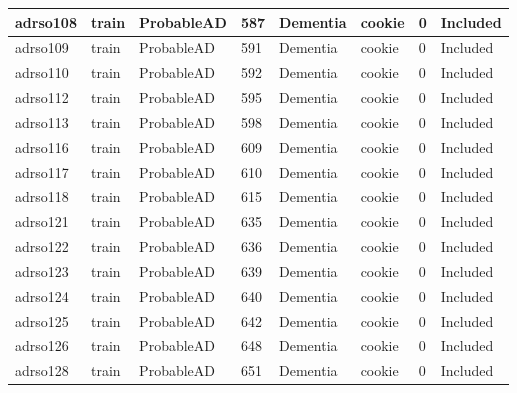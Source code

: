 \begin{center}
\begin{longtable}{|l|l|l|l|l|l|l|l|}
adrso108  & train            & ProbableAD   & 587         & Dementia             & cookie          & 0                & Included      \\ \hline
adrso109  & train            & ProbableAD   & 591         & Dementia             & cookie          & 0                & Included      \\ \hline
adrso110  & train            & ProbableAD   & 592         & Dementia             & cookie          & 0                & Included      \\ \hline
adrso112  & train            & ProbableAD   & 595         & Dementia             & cookie          & 0                & Included      \\ \hline
adrso113  & train            & ProbableAD   & 598         & Dementia             & cookie          & 0                & Included      \\ \hline
adrso116  & train            & ProbableAD   & 609         & Dementia             & cookie          & 0                & Included      \\ \hline
adrso117  & train            & ProbableAD   & 610         & Dementia             & cookie          & 0                & Included      \\ \hline
adrso118  & train            & ProbableAD   & 615         & Dementia             & cookie          & 0                & Included      \\ \hline
adrso121  & train            & ProbableAD   & 635         & Dementia             & cookie          & 0                & Included      \\ \hline
adrso122  & train            & ProbableAD   & 636         & Dementia             & cookie          & 0                & Included      \\ \hline
adrso123  & train            & ProbableAD   & 639         & Dementia             & cookie          & 0                & Included      \\ \hline
adrso124  & train            & ProbableAD   & 640         & Dementia             & cookie          & 0                & Included      \\ \hline
adrso125  & train            & ProbableAD   & 642         & Dementia             & cookie          & 0                & Included      \\ \hline
adrso126  & train            & ProbableAD   & 648         & Dementia             & cookie          & 0                & Included      \\ \hline
adrso128  & train            & ProbableAD   & 651         & Dementia             & cookie          & 0                & Included      \\ \hline

\end{longtable}
\end{center}
